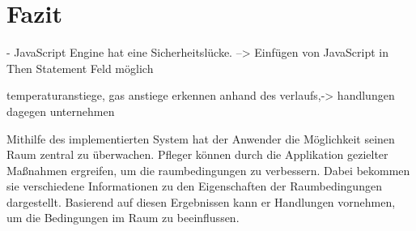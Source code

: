 \chapter{Fazit}

- JavaScript Engine hat eine Sicherheitslücke. --> Einfügen von JavaScript in Then Statement Feld möglich

temperaturanstiege, gas anstiege erkennen anhand des verlaufs,-> handlungen dagegen unternehmen


Mithilfe des implementierten System hat der Anwender die Möglichkeit seinen Raum zentral zu überwachen. Pfleger können durch die Applikation gezielter Maßnahmen ergreifen, um die raumbedingungen zu verbessern. Dabei bekommen sie verschiedene Informationen zu den Eigenschaften der Raumbedingungen dargestellt. Basierend auf diesen Ergebnissen kann er Handlungen vornehmen, um die Bedingungen im Raum zu beeinflussen.
